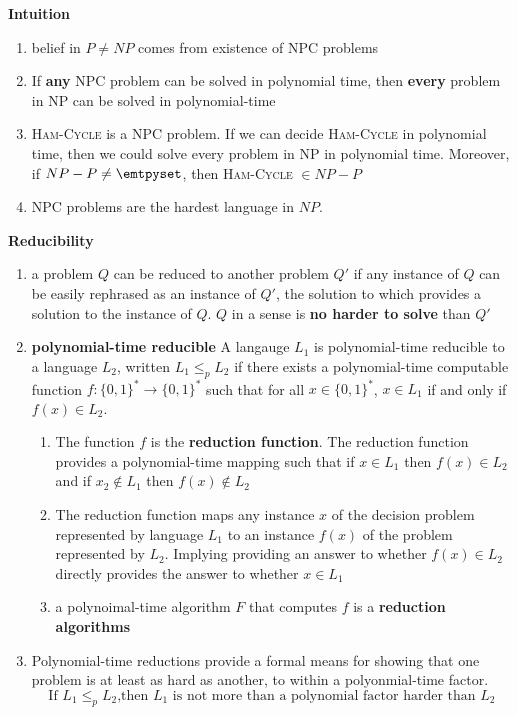 \documentclass[11pt]{article}
\begin{document}
\begin{defn*}
    \textbf{Intuition}
    \begin{enumerate}
        \item belief in $P\neq NP$ comes from existence of NPC problems
        \item If \textbf{any} NPC problem can be solved in polynomial time, then \textbf{every} problem in NP can be solved in polynomial-time
        \item \textsc{Ham-Cycle} is a NPC problem. If we can decide \textsc{Ham-Cycle} in polynomial time, then we could solve every problem in NP in polynomial time. Moreover, if $NP-P\neq \emtpyset$, then \textsc{Ham-Cycle} $\in NP - P$
        \item NPC problems are the hardest language in $NP$. 
    \end{enumerate}
\end{defn*}



\begin{defn*}
    \textbf{Reducibility} 
    \begin{enumerate}
        \item a problem $Q$ can be reduced to another problem $Q'$ if any instance of $Q$ can be easily rephrased as an instance of $Q'$, the solution to which provides a solution to the instance of $Q$. $Q$ in a sense is \textbf{no harder to solve} than $Q'$
        \item \textbf{polynomial-time reducible} A langauge $L_1$ is polynomial-time reducible to a language $L_2$, written $L_1 \leq_p L_2$ if there exists a polynomial-time computable function $f: \{ 0,1\}^* \to \{ 0,1\}^*$ such that for all $x\in  \{ 0,1\}^*$, $x\in L_1$ if and only if $f(x)\in L_2$. 
        \begin{enumerate}
            \item The function $f$ is the \textbf{reduction function}. The reduction function provides a polynomial-time mapping such that if $x\in L_1$ then $f(x)\in L_2$ and if $x_2\not\in L_1$ then $f(x) \not\in L_2$ 
            \item The reduction function maps any instance $x$ of the decision problem represented by language $L_1$ to an instance $f(x)$ of the problem represented by $L_2$. Implying providing an answer to whether $f(x)\in L_2$ directly provides the answer to whether $x\in L_1$
            \item a polynoimal-time algorithm $F$ that computes $f$ is a \textbf{reduction algorithms}
        \end{enumerate}
        \item Polynomial-time reductions provide a formal means for showing that one problem is at least as hard as another, to within a polyonmial-time factor.
        \[
            \text{If $L_1 \leq_p L_2$,then $L_1$ is not more than a polynomial factor harder than $L_2$}
        \]
    \end{enumerate}
\end{defn*}
\end{document}
